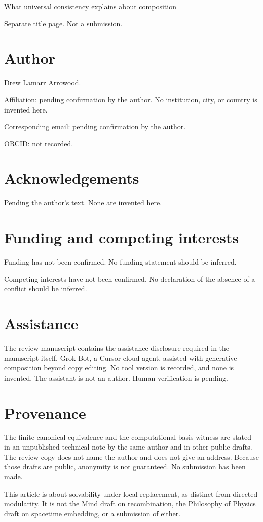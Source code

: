 \documentclass[11pt]{article}
\begin{document}
\begin{center}
{\Large What universal consistency explains about composition\par}
\vspace{1em}
Separate title page. Not a submission.\par
\end{center}
\section*{Author}
Drew Lamarr Arrowood.

Affiliation: pending confirmation by the author. No institution, city, or country is invented here.

Corresponding email: pending confirmation by the author.

ORCID: not recorded.

\section*{Acknowledgements}
Pending the author's text. None are invented here.

\section*{Funding and competing interests}
Funding has not been confirmed. No funding statement should be inferred.

Competing interests have not been confirmed. No declaration of the absence of a conflict should be inferred.

\section*{Assistance}
The review manuscript contains the assistance disclosure required in the manuscript itself. Grok Bot, a Cursor cloud agent, assisted with generative composition beyond copy editing. No tool version is recorded, and none is invented. The assistant is not an author. Human verification is pending.

\section*{Provenance}
The finite canonical equivalence and the computational-basis witness are stated in an unpublished technical note by the same author and in other public drafts. The review copy does not name the author and does not give an address. Because those drafts are public, anonymity is not guaranteed. No submission has been made.

This article is about solvability under local replacement, as distinct from directed modularity. It is not the Mind draft on recombination, the Philosophy of Physics draft on spacetime embedding, or a submission of either.
\end{document}
